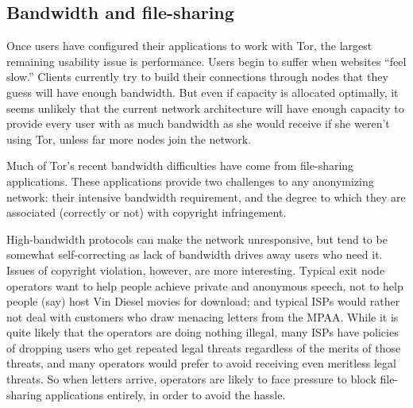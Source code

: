 \documentclass{llncs}
\begin{document}

\subsection{Bandwidth and file-sharing}
\label{subsec:bandwidth-and-file-sharing}
Once users have configured their applications to work with Tor, the largest
remaining usability issue is performance.  Users begin to suffer
when websites ``feel slow.''
Clients currently try to build their connections through nodes that they
guess will have enough bandwidth.  But even if capacity is allocated
optimally, it seems unlikely that the current network architecture will have
enough capacity to provide every user with as much bandwidth as she would
receive if she weren't using Tor, unless far more nodes join the network.


Much of Tor's recent bandwidth difficulties have come from file-sharing
applications.  These applications provide two challenges to
any anonymizing network: their intensive bandwidth requirement, and the
degree to which they are associated (correctly or not) with copyright
infringement.

High-bandwidth protocols can make the network unresponsive,
but tend to be somewhat self-correcting as lack of bandwidth drives away
users who need it.  Issues of copyright violation,
however, are more interesting.  Typical exit node operators want to help
people achieve private and anonymous speech, not to help people (say) host
Vin Diesel movies for download; and typical ISPs would rather not
deal with customers who draw menacing letters
from the MPAA\@.  While it is quite likely that the operators are doing nothing
illegal, many ISPs have policies of dropping users who get repeated legal
threats regardless of the merits of those threats, and many operators would
prefer to avoid receiving even meritless legal threats.
So when letters arrive, operators are likely to face
pressure to block file-sharing applications entirely, in order to avoid the
hassle.
\end{document}
